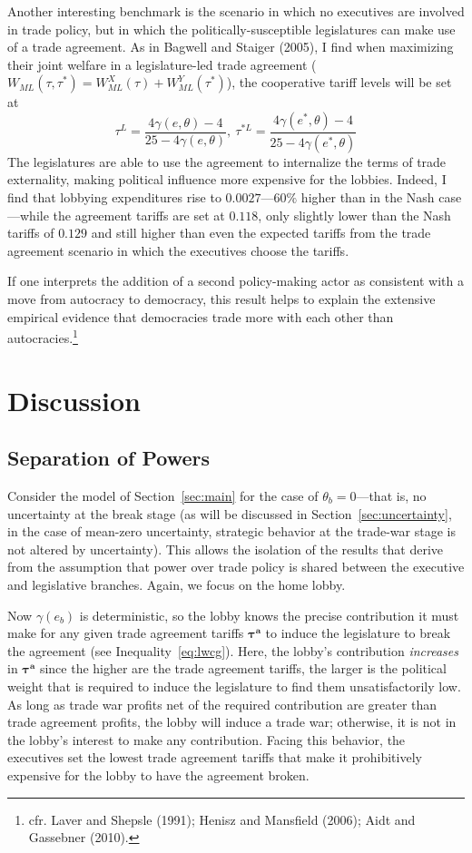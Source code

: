 \documentclass[10pt]{article}
\newcommand{\ve}{\theta}
\newcommand{\bta}{\bm{\tau^a}}
\newcommand{\ga}{\gamma}
\begin{document}
Another interesting benchmark is the scenario in which no executives are involved in trade policy, but in which the politically-susceptible legislatures can make use of a trade agreement. As in Bagwell and Staiger (2005), I find when maximizing their joint welfare in a legislature-led trade agreement ($W_{\mathit{ML}}(\tau, \tau^*) = W_{\mathit{ML}}^X(\tau) + W_{\mathit{ML}}^Y(\tau^*)$), the cooperative tariff levels will be set at
\[
  \tau^L = \frac{4\ga(e,\ve)-4}{25-4\ga(e,\ve)}, \ \tau^{*L} = \frac{4\ga(e^*,\ve)-4}{25-4\ga(e^*,\ve)}
\]
The legislatures are able to use the agreement to internalize the terms of trade externality, making political influence more expensive for the lobbies. Indeed, I find that lobbying expenditures rise to $0.0027$---60$\%$ higher than in the Nash case---while the agreement tariffs are set at $0.118$, only slightly lower than the Nash tariffs of $0.129$ and still higher than even the expected tariffs from the trade agreement scenario in which the executives choose the tariffs.

If one interprets the addition of a second policy-making actor as consistent with a move from autocracy to democracy, this result helps to explain the extensive empirical evidence that democracies trade more with each other than autocracies.\footnote{cfr. Laver and Shepsle (1991); Henisz and Mansfield (2006); Aidt and Gassebner (2010).}


\section{Discussion}
\label{sec:dis}

\subsection{Separation of Powers}
\label{sec:sep_powers}
Consider the model of Section~\ref{sec:main} for the case of $\ve_b=0$---that is, no uncertainty at the break stage (as will be discussed in Section~\ref{sec:uncertainty}, in the case of mean-zero uncertainty, strategic behavior at the trade-war stage is not altered by uncertainty). This allows the isolation of the results that derive from the assumption that power over trade policy is shared between the executive and legislative branches. Again, we focus on the home lobby.

Now $\ga(e_b)$ is deterministic, so the lobby knows the precise contribution it must make for any given trade agreement tariffs $\bta$ to induce the legislature to break the agreement (see Inequality~\ref{eq:lwcg}). Here, the lobby's contribution \textit{increases} in $\bta$ since the higher are the trade agreement tariffs, the larger is the political weight that is required to induce the legislature to find them unsatisfactorily low. As long as trade war profits net of the required contribution are greater than trade agreement profits, the lobby will induce a trade war; otherwise, it is not in the lobby's interest to make any contribution. Facing this behavior, the executives set the lowest trade agreement tariffs that make it prohibitively expensive for the lobby to have the agreement broken.
\end{document}
